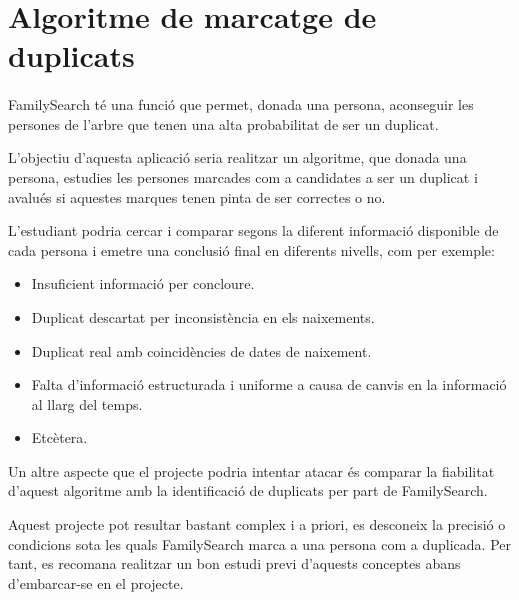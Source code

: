 \section{Algoritme de marcatge de duplicats}

    \paragraph{}
    FamilySearch té una funció que permet, donada una persona, aconseguir les persones de l'arbre que tenen una alta probabilitat de ser un duplicat.

    L'objectiu d'aquesta aplicació seria realitzar un algoritme, que donada una persona, estudies les persones marcades com a candidates a ser un duplicat  i avalués si aquestes marques tenen pinta de ser correctes o no.

    L'estudiant podria cercar i comparar segons la diferent informació disponible de cada persona i emetre una conclusió final en diferents nivells, com per exemple:

    \begin{itemize}
        \item Insuficient informació per concloure.
        \item Duplicat descartat per inconsistència en els naixements.
        \item Duplicat real amb coincidències de dates de naixement.
        \item Falta d'informació estructurada i uniforme a causa de canvis en la informació al llarg del temps.
        \item Etcètera.
    \end{itemize}

    Un altre aspecte que el projecte podria intentar atacar és comparar la fiabilitat d'aquest algoritme amb la identificació de duplicats per part de FamilySearch.

    Aquest projecte pot resultar bastant complex i a priori, es desconeix la precisió o condicions sota les quals FamilySearch marca a una persona com a duplicada. Per tant, es recomana realitzar un bon estudi previ d'aquests conceptes abans d'embarcar-se en el projecte.
